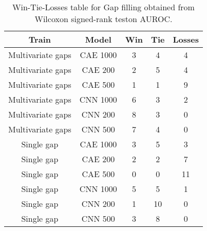 \begin{table}[H]
\centering
\begin{tabular}{|c|c|c|c|c|}

    \textbf{Train} & \textbf{Model} &  \textbf{Win} &  \textbf{Tie} &  \textbf{Losses} \\
\hline

 Multivariate gaps &       CAE 1000 &             3 &             4 &                4 \\
\hline
 Multivariate gaps &        CAE 200 &             2 &             5 &                4 \\
\hline
 Multivariate gaps &        CAE 500 &             1 &             1 &                9 \\
\hline
 Multivariate gaps &       CNN 1000 &             6 &             3 &                2 \\
\hline
 Multivariate gaps &        CNN 200 &             8 &             3 &                0 \\
\hline
 Multivariate gaps &        CNN 500 &             7 &             4 &                0 \\
\hline
        Single gap &       CAE 1000 &             3 &             5 &                3 \\
\hline
        Single gap &        CAE 200 &             2 &             2 &                7 \\
\hline
        Single gap &        CAE 500 &             0 &             0 &               11 \\
\hline
        Single gap &       CNN 1000 &             5 &             5 &                1 \\
\hline
        Single gap &        CNN 200 &             1 &            10 &                0 \\
\hline
        Single gap &        CNN 500 &             3 &             8 &                0 \\
\hline

\end{tabular}
\caption{Win-Tie-Losses table for Gap filling obtained from Wilcoxon signed-rank teston AUROC.}
\label{tab:gap_filling_model_training_data_comparison}
\end{table}